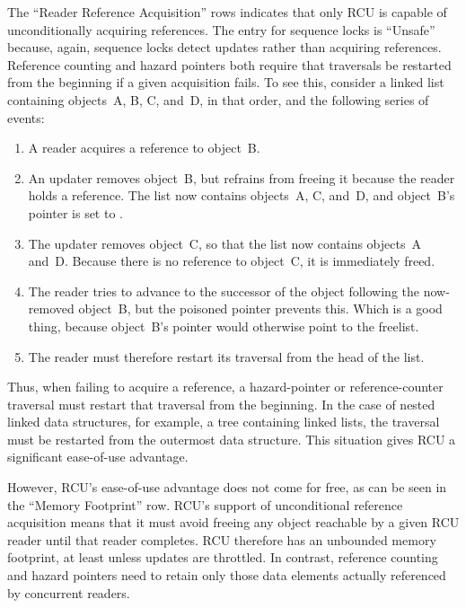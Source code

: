 The ``Reader Reference Acquisition'' rows indicates that only RCU is
capable of unconditionally acquiring references.
The entry for sequence locks is ``Unsafe'' because, again, sequence locks
detect updates rather than acquiring references.
Reference counting and hazard pointers both require that traversals be
restarted from the beginning if a given acquisition fails.
To see this, consider a linked list containing objects~A, B, C, and~D,
in that order, and the following series of events:

\begin{enumerate}
\item	A reader acquires a reference to object~B.
\item	An updater removes object~B, but refrains from freeing it because
	the reader holds a reference.
	The list now contains objects~A, C, and~D, and
	object~B's  pointer is set to .
\item	The updater removes object~C, so that the list now contains
	objects~A and~D\@.
	Because there is no reference to object~C, it is immediately freed.
\item	The reader tries to advance to the successor of the object
	following the now-removed object~B, but the poisoned
	 pointer prevents this.
	Which is a good thing, because object~B's  pointer
	would otherwise point to the freelist.
\item	The reader must therefore restart its traversal from the head
	of the list.
\end{enumerate}

Thus, when failing to acquire a reference, a hazard-pointer or
reference-counter traversal must restart that traversal from the
beginning.
In the case of nested linked data structures, for example, a
tree containing linked lists, the traversal must be restarted from
the outermost data structure.
This situation gives RCU a significant ease-of-use advantage.

However, RCU's ease-of-use advantage does not come
for free, as can be seen in the ``Memory Footprint'' row.
RCU's support of unconditional reference acquisition means that
it must avoid freeing any object reachable by a given
RCU reader until that reader completes.
RCU therefore has an unbounded memory footprint, at least unless updates
are throttled.
In contrast, reference counting and hazard pointers need to  retain only
those data elements actually referenced by concurrent readers.

